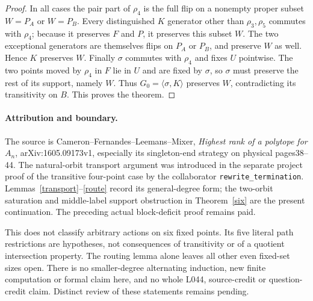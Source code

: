 \documentclass[10pt,a4paper]{article}
\newcommand{\gen}[1]{\langle#1\rangle}
\begin{document}
\begin{proof}
In all cases the pair part of $\rho_4$ is the full flip on a
nonempty proper subset $W=P_A$ or $W=P_B$. Every distinguished
$K$ generator other than $\rho_3,\rho_5$ commutes with $\rho_4$;
because it preserves $F$ and $P$, it preserves this subset $W$.
The two exceptional generators are themselves flips on $P_A$ or
$P_B$, and preserve $W$ as well. Hence $K$ preserves $W$.
Finally $\sigma$ commutes with $\rho_4$ and fixes $U$ pointwise.
The two points moved by $\rho_4$ in $F$ lie in $U$ and are fixed
by $\sigma$, so $\sigma$ must preserve the rest of its support,
namely $W$. Thus $G_0=\gen{\sigma,K}$ preserves $W$, contradicting
its transitivity on $B$. This proves the theorem.
\end{proof}

\paragraph{Attribution and boundary.}
The source is Cameron--Fernandes--Leemans--Mixer,
\emph{Highest rank of a polytope for $A_n$}, arXiv:1605.09173v1,
especially its singleton-end strategy on physical pages38--44.
The natural-orbit transport argument was introduced in the separate
project proof of the transitive four-point case by the collaborator
\texttt{rewrite\_termination}. Lemmas~\ref{transport}--\ref{route}
record its general-degree form; the two-orbit saturation and
middle-label support obstruction in Theorem~\ref{six} are the present
continuation. The preceding actual block-deficit proof remains paid.

This does not classify arbitrary actions on six fixed points.
Its five literal path restrictions are hypotheses, not consequences
of transitivity or of a quotient intersection property. The routing
lemma alone leaves all other even fixed-set sizes open. There is no
smaller-degree alternating induction, new finite computation or formal
claim here, and no whole L044, source-credit or question-credit claim.
Distinct review of these statements remains pending.
\end{document}
